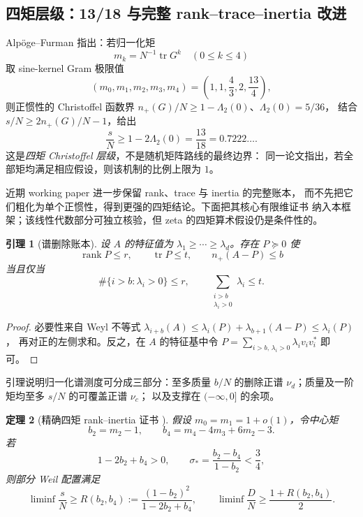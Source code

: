 \documentclass[UTF8,11pt,a4paper]{ctexart}
\newtheorem{theorem}{定理}[section]
\newtheorem{lemma}[theorem]{引理}
\theoremstyle{definition}
\theoremstyle{remark}
\newcommand{\tr}{\operatorname{tr}}
\newcommand{\rank}{\operatorname{rank}}
\begin{document}
\subsection{四矩层级：13/18 与完整 rank--trace--inertia 改进}

Alpöge--Furman \cite[\S7.2(d)--(f)]{AF26} 指出：若归一化矩
\[
 m_k=N^{-1}\tr G^k\quad(0\le k\le4)
\]
取 sine-kernel Gram 极限值
\[
 (m_0,m_1,m_2,m_3,m_4)
 =\left(1,1,\frac43,2,\frac{13}{4}\right),
\]
则正惯性的 Christoffel 函数界
$n_+(G)/N\ge1-\Lambda_2(0)$、$\Lambda_2(0)=5/36$，
结合 $s/N\ge2n_+(G)/N-1$，给出
\[
 \frac{s}{N}\ge1-2\Lambda_2(0)=\frac{13}{18}=0.7222\ldots.
\]
这是\emph{四矩 Christoffel 层级}，不是随机矩阵路线的最终边界：
同一论文指出，若全部矩均满足相应假设，则该机制的比例上限为 $1$。

近期 working paper \cite{Notik26} 进一步保留 rank、trace 与 inertia 的完整账本，
而不先把它们粗化为单个正惯性，得到更强的四矩结论。下面把其核心有限维证书
纳入本框架；该线性代数部分可独立核验，但 zeta 的四矩算术假设仍是条件性的。

\begin{lemma}[谱删除账本]\label{lem:deletion}
设 $A$ 的特征值为 $\lambda_1\ge\cdots\ge\lambda_d$。存在
$P\succeq0$ 使
\[
 \rank P\le r,\qquad \tr P\le t,\qquad n_+(A-P)\le b
\]
当且仅当
\[
 \#\{i>b:\lambda_i>0\}\le r,\qquad
 \sum_{\substack{i>b\\\lambda_i>0}}\lambda_i\le t.
\]
\end{lemma}

\begin{proof}
必要性来自 Weyl 不等式
$\lambda_{i+b}(A)\le\lambda_i(P)+\lambda_{b+1}(A-P)\le\lambda_i(P)$，
再对正的左侧求和。反之，在 $A$ 的特征基中令
$P=\sum_{i>b,\,\lambda_i>0}\lambda_i v_iv_i^*$ 即可。
\end{proof}

引理说明归一化谱测度可分成三部分：至多质量 $b/N$ 的删除正谱
$\nu_d$；质量及一阶矩均至多 $s/N$ 的可覆盖正谱 $\nu_c$；
以及支撑在 $(-\infty,0]$ 的余项。

\begin{theorem}[精确四矩 rank--inertia 证书 {\cite{Notik26}}]
\label{thm:quartic}
假设 $m_0=m_1=1+o(1)$，令中心矩
\[
 b_2=m_2-1,\qquad b_4=m_4-4m_3+6m_2-3.
\]
若
\[
 1-2b_2+b_4>0,\qquad
 \sigma_*=\frac{b_2-b_4}{1-b_2}<\frac34,
\]
则部分 Weil 配置满足
\[
 \liminf\frac{s}{N}\ge
 R(b_2,b_4):=\frac{(1-b_2)^2}{1-2b_2+b_4},
\qquad
 \liminf\frac{D}{N}\ge\frac{1+R(b_2,b_4)}2.
\]
\end{theorem}
\end{document}
